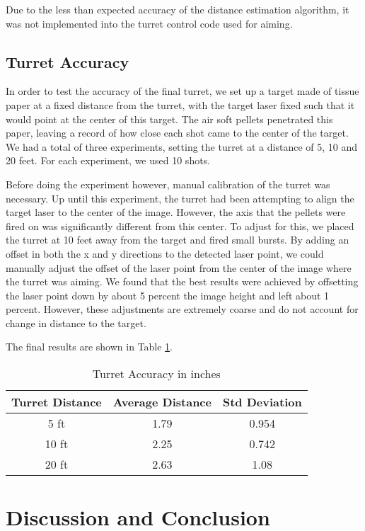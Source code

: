 \documentclass[10pt,twocolumn,letterpaper]{article}
\begin{document}
Due to the less than expected accuracy of the distance estimation algorithm, it was not implemented into the turret control code used for aiming.

\subsection{Turret Accuracy}

In order to test the accuracy of the final turret, we set up a target made of tissue paper at a fixed distance from the turret, with the target laser fixed such that it would point at the center of this target. The air soft pellets penetrated this paper, leaving a record of how close each shot came to the center of the target. We had a total of three experiments, setting the turret at a distance of 5, 10 and 20 feet. For each experiment, we used 10 shots.

Before doing the experiment however, manual calibration of the turret was necessary. Up until this experiment, the turret had been attempting to align the target laser to the center of the image. However, the axis that the pellets were fired on was significantly different from this center. To adjust for this, we placed the turret at 10 feet away from the target and fired small bursts. By adding an offset in both the x and y directions to the detected laser point, we could manually adjust the offset of the laser point from the center of the image where the turret was aiming.  We found that the best results were achieved by offsetting the laser point down by about 5 percent the image height and left about 1 percent. However, these adjustments are extremely coarse and do not account for change in distance to the target.

The final results are shown in Table \ref{table:accuracy}. 

\begin{table}[ht]
\caption{Turret Accuracy in inches}
\centering
\begin{tabular} {c c c}
\hline
Turret Distance & Average Distance & Std Deviation\\
\hline
5 ft & 1.79 & 0.954 \\
10 ft & 2.25 & 0.742 \\
20 ft & 2.63 & 1.08 \\
\hline
\end{tabular}
\label{table:accuracy}
\end{table}

\section{Discussion and Conclusion}
\end{document}
